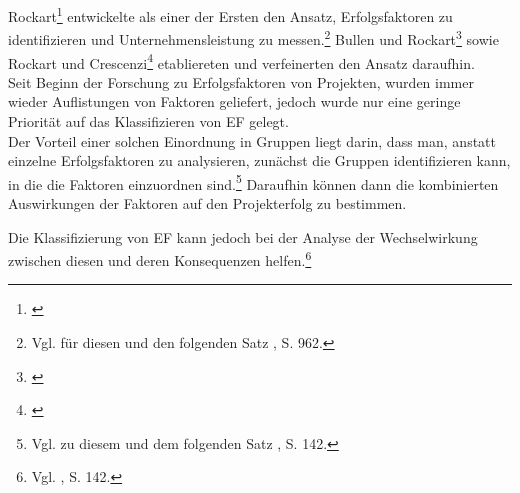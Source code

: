 Rockart\footnote{\cite{Rockart.1979}} entwickelte als einer der Ersten den Ansatz, Erfolgsfaktoren zu identifizieren und Unternehmensleistung zu messen.\footnote{Vgl. für diesen und den folgenden Satz \cite{Chow.2008}, S. 962.}
Bullen und Rockart\footnote{\cite{Bullen.1981}} sowie Rockart und Crescenzi\footnote{\cite{Rockart.1984}} etabliereten und verfeinerten den Ansatz daraufhin.\\
Seit Beginn der Forschung zu Erfolgsfaktoren von Projekten, wurden immer wieder Auflistungen von Faktoren 
geliefert, jedoch wurde nur eine geringe Priorität auf das Klassifizieren von EF gelegt.\\\noindent
Der Vorteil einer solchen Einordnung in Gruppen liegt darin, dass man, anstatt einzelne Erfolgsfaktoren zu analysieren, zunächst die Gruppen identifizieren kann, in die die Faktoren
einzuordnen sind.\footnote{Vgl. zu diesem und dem folgenden Satz \cite{Belassi.1996}, S. 142.} Daraufhin können dann die kombinierten Auswirkungen der Faktoren auf den Projekterfolg zu bestimmen.

Die Klassifizierung von EF kann jedoch bei der Analyse der Wechselwirkung zwischen diesen und deren Konsequenzen helfen.\footnote{Vgl. \cite{Belassi.1996}, S. 142.} 



